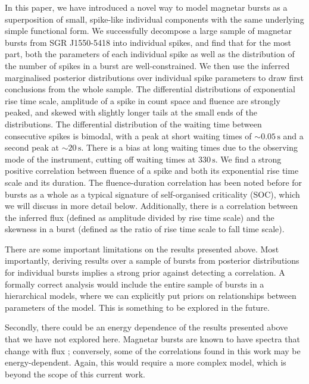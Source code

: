 \documentclass[12pt]{emulateapj}
\begin{document}
In this paper, we have introduced a novel way to model magnetar bursts as a superposition of small, spike-like individual components with the same
underlying simple functional form. We successfully decompose a large sample of magnetar bursts from SGR J1550-5418 into individual spikes, and 
find that for the most part, both the parameters of each individual spike as well as the distribution of the number of spikes in a burst are well-constrained.
We then use the inferred marginalised posterior distributions over individual spike parameters to draw first conclusions from the whole sample. 
The differential distributions of exponential rise time scale, amplitude of a spike in count space and fluence are strongly peaked, and skewed with slightly longer
tails at the small ends of the distributions. The differential distribution of the waiting time between consecutive spikes is bimodal, with a peak at short waiting times
of $\sim\!\!0.05\,\mathrm{s}$ and a second peak at $\sim\!\! 20\,\mathrm{s}$. There is a bias at long waiting times due to the observing mode of the instrument, cutting off
waiting times at $330\,\mathrm{s}$. 
We find a strong positive correlation between fluence of a spike and both its exponential rise time scale and its duration. The fluence-duration correlation has been noted
before for bursts as a whole \citep{gogus1999,gogus2000,vanderhorst2012} as a typical signature of self-organised criticality (SOC), which we will discuss in more 
detail below. 
Additionally, there is a correlation between
the inferred flux (defined as amplitude divided by rise time scale) and the skewness in a burst (defined as the ratio of rise time scale to fall time scale). 

There are some important limitations on the results presented above. Most importantly, deriving results over a sample of bursts from posterior distributions for individual bursts
implies a strong prior against detecting a correlation. A formally correct analysis would include the entire sample of bursts in a hierarchical models, where we can explicitly put
priors on relationships between parameters of the model. This is something to be explored in the future.

Secondly, there could be an energy dependence of the results presented above that we have not explored here. Magnetar bursts are known to have spectra that change with flux 
\citep[e.g.][]{younes2013}; conversely, some of the correlations found in this work may be energy-dependent. Again, this would require a more complex model, which is beyond the 
scope of this current work.
\end{document}
